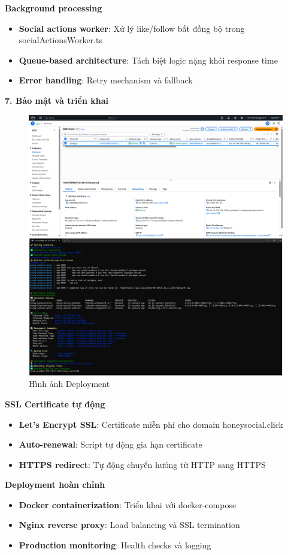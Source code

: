 \textbf{Background processing}
\begin{itemize}
    \item \textbf{Social actions worker}: Xử lý like/follow bất đồng bộ trong socialActionsWorker.ts
    \item \textbf{Queue-based architecture}: Tách biệt logic nặng khỏi response time
    \item \textbf{Error handling}: Retry mechanism và fallback
\end{itemize}
\newpage
\textbf{7. Bảo mật và triển khai}
\begin{figure}[H]
    \centering
    \includegraphics[width=1\textwidth]{image/thucnghiem/Deployment.png}
    \caption{Hình ảnh Deployment}
    \label{fig:deployment}
\end{figure}

\textbf{SSL Certificate tự động}
\begin{itemize}
    \item \textbf{Let's Encrypt SSL}: Certificate miễn phí cho domain honeysocial.click
    \item \textbf{Auto-renewal}: Script tự động gia hạn certificate
    \item \textbf{HTTPS redirect}: Tự động chuyển hướng từ HTTP sang HTTPS
\end{itemize}

\textbf{Deployment hoàn chỉnh}
\begin{itemize}
    \item \textbf{Docker containerization}: Triển khai với docker-compose
    \item \textbf{Nginx reverse proxy}: Load balancing và SSL termination
    \item \textbf{Production monitoring}: Health checks và logging
\end{itemize}
